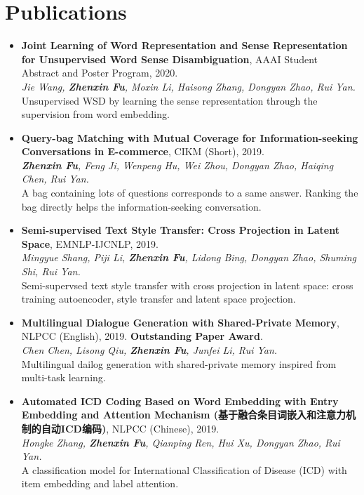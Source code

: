 \documentclass[letterpaper]{article}
\begin{document}
\section*{Publications}
\begin{itemize}

\item \textbf{Joint Learning of Word Representation and Sense Representation for Unsupervised Word Sense Disambiguation}, AAAI Student Abstract and Poster Program, 2020. \\
{\it Jie Wang, \textbf{Zhenxin Fu}, Moxin Li, Haisong Zhang, Dongyan Zhao, Rui Yan.} \\
Unsupervised WSD by learning the sense representation through the supervision from word embedding.

\item \textbf{Query-bag Matching with Mutual Coverage for Information-seeking Conversations in E-commerce}, CIKM (Short), 2019. \\
{\it \textbf{Zhenxin Fu}, Feng Ji, Wenpeng Hu, Wei Zhou, Dongyan Zhao, Haiqing Chen, Rui Yan.} \\
A bag containing lots of questions corresponds to a same answer. Ranking the bag directly helps the information-seeking conversation.

\item \textbf{Semi-supervised Text Style Transfer: Cross Projection in Latent Space}, EMNLP-IJCNLP, 2019. \\
{\it Mingyue Shang, Piji Li, \textbf{Zhenxin Fu}, Lidong Bing, Dongyan Zhao, Shuming Shi, Rui Yan.} \\
Semi-supervsed text style transfer with cross projection in latent space: cross training autoencoder, style transfer and latent space projection.

\item \textbf{Multilingual Dialogue Generation with Shared-Private Memory}, NLPCC (English), 2019. \textbf{Outstanding Paper Award}. \\
{\it Chen Chen, Lisong Qiu, \textbf{Zhenxin Fu}, Junfei Li, Rui Yan. } \\
Multilingual dailog generation with shared-private memory inspired from multi-task learning.

\item \textbf{Automated ICD Coding Based on Word Embedding with Entry Embedding and Attention Mechanism (基于融合条目词嵌入和注意力机制的自动ICD编码)}, NLPCC (Chinese), 2019. \\
{\it Hongke Zhang, \textbf{Zhenxin Fu}, Qianping Ren, Hui Xu, Dongyan Zhao, Rui Yan.} \\
A classification model for International Classification of Disease (ICD) with item embedding and label attention.


\end{itemize}
\end{document}
